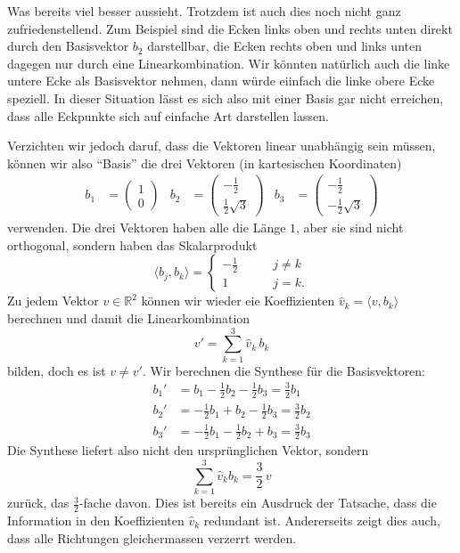 Was bereits viel besser aussieht.
Trotzdem ist auch dies noch nicht ganz zufriedenstellend. 
Zum Beispiel sind die Ecken links oben und rechts unten direkt durch den
Basisvektor $b_2$ darstellbar, die Ecken rechts oben und links unten
dagegen nur durch eine Linearkombination.
Wir könnten natürlich auch die linke untere Ecke als Basisvektor nehmen,
dann würde eiinfach die linke obere Ecke speziell.
In dieser Situation lässt es sich also mit einer Basis gar nicht erreichen,
dass alle Eckpunkte sich auf einfache Art darstellen lassen.

Verzichten wir jedoch daruf, dass die Vektoren linear unabhängig sein müssen,
können wir also ``Basis'' die drei Vektoren (in kartesischen Koordinaten)
\begin{align}
b_1
&=
\begin{pmatrix}1\\0\end{pmatrix}
&
b_2
&=
\begin{pmatrix}-\frac12\\\frac12\sqrt{3}\end{pmatrix}
&
b_3
&=
\begin{pmatrix}-\frac12\\-\frac12\sqrt{3}\end{pmatrix}
\label{hexagonbasis}
\end{align}
verwenden.
Die drei Vektoren haben alle die Länge $1$, aber sie sind nicht
orthogonal, sondern haben das Skalarprodukt
\[
\langle b_j,b_k\rangle
=
\begin{cases}
-\frac12&\qquad j\ne k\\
1&\qquad j=k.
\end{cases}
\]
Zu jedem Vektor $v\in\mathbb R^2$ können wir wieder eie Koeffizienten
$\hat{v}_k=\langle v,b_k\rangle$ berechnen und damit die Linearkombination
\[
v' = \sum_{k=1}^3 \hat{v}_k\,b_k
\]
bilden,
doch es ist $v\ne v'$.
Wir berechnen die Synthese für die Basisvektoren:
\begin{align*}
b_1'
&=
b_1 - \frac12 b_2 - \frac 12 b_3
=
\frac32b_1
\\
b_2'
&=
-\frac12 b_1 + b_2 -\frac12 b_3
=
\frac32b_2
\\
b_3'
&=
-\frac12b_1-\frac12 b_2 + b_3
=
\frac32b_3
\end{align*}
Die Synthese liefert also nicht den ursprünglichen Vektor, sondern
\begin{equation}
\sum_{k=1}^3 \hat{v}_k b_k = \frac32\,v
\label{geometrie:32beispiel}
\end{equation}
zurück, das $\frac32$-fache davon.
Dies ist bereits ein Ausdruck der Tatsache, dass die Information in den
Koeffizienten $\hat{v}_k$ redundant ist.
Andererseits zeigt dies auch, dass alle Richtungen gleichermassen
verzerrt werden.

